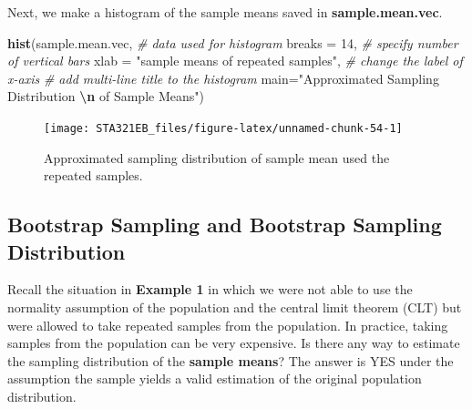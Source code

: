 \documentclass[
]{book}
\newenvironment{Shaded}{\begin{snugshade}}{\end{snugshade}}
\newcommand{\AttributeTok}[1]{\textcolor[rgb]{0.13,0.29,0.53}{#1}}
\newcommand{\CommentTok}[1]{\textcolor[rgb]{0.56,0.35,0.01}{\textit{#1}}}
\newcommand{\DecValTok}[1]{\textcolor[rgb]{0.00,0.00,0.81}{#1}}
\newcommand{\FunctionTok}[1]{\textcolor[rgb]{0.13,0.29,0.53}{\textbf{#1}}}
\newcommand{\NormalTok}[1]{#1}
\newcommand{\SpecialCharTok}[1]{\textcolor[rgb]{0.81,0.36,0.00}{\textbf{#1}}}
\newcommand{\StringTok}[1]{\textcolor[rgb]{0.31,0.60,0.02}{#1}}
\begin{document}
Next, we make a histogram of the sample means saved in \textbf{sample.mean.vec}.

\begin{Shaded}
\begin{Highlighting}[]
\FunctionTok{hist}\NormalTok{(sample.mean.vec,   }\CommentTok{\# data used for histogram}
     \AttributeTok{breaks =} \DecValTok{14}\NormalTok{,       }\CommentTok{\# specify number of vertical bars}
     \AttributeTok{xlab =} \StringTok{"sample means of repeated samples"}\NormalTok{, }\CommentTok{\# change the label of x{-}axis}
     \CommentTok{\# add multi{-}line title to the histogram}
     \AttributeTok{main=}\StringTok{"Approximated Sampling Distribution  }\SpecialCharTok{\textbackslash{}n}\StringTok{  of Sample Means"}\NormalTok{)  }
\end{Highlighting}
\end{Shaded}

\begin{figure}

{\centering \texttt{[image: STA321EB\_files/figure-latex/unnamed-chunk-54-1]} 

}

\caption{Approximated sampling distribution of sample mean used the repeated samples.}\label{fig:unnamed-chunk-54}
\end{figure}

\hypertarget{bootstrap-sampling-and-bootstrap-sampling-distribution}{%
\subsection{Bootstrap Sampling and Bootstrap Sampling Distribution}\label{bootstrap-sampling-and-bootstrap-sampling-distribution}}

Recall the situation in \textbf{Example 1} in which we were not able to use the normality assumption of the population and the central limit theorem (CLT) but were allowed to take repeated samples from the population. In practice, taking samples from the population can be very expensive. Is there any way to estimate the sampling distribution of the \textbf{sample means}? The answer is YES under the assumption the sample yields a valid estimation of the original population distribution.
\end{document}

